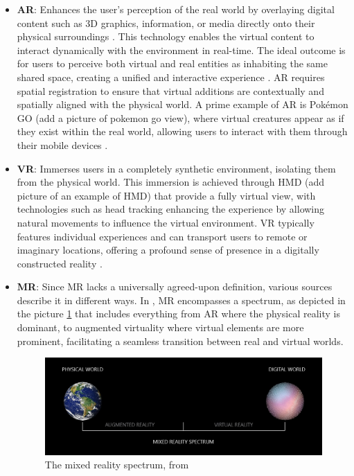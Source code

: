 \begin{itemize}
    \item \textbf{\ac{AR}}: Enhances the user's perception of the real world by overlaying digital content such as 3D graphics, information, or media directly 
    onto their physical surroundings \cite{liu2022digitaltwin}. 
    This technology enables the virtual content to interact dynamically with the environment in real-time. 
    The ideal outcome is for users to perceive both virtual and real entities as inhabiting the same shared space, creating a unified and interactive 
    experience \cite{Azuma1997}.
    \ac{AR} requires spatial registration to ensure that virtual additions are contextually and spatially aligned with the physical world.
    A prime example of \ac{AR} is Pokémon GO (add a picture of pokemon go view), where virtual creatures appear as if they exist within the real world, 
    allowing users to interact with them through their mobile devices \cite{whatismixedreality}.

    \item \textbf{\ac{VR}}: Immerses users in a completely synthetic environment, isolating them from the physical world. This immersion is achieved through 
    \ac{HMD} (add picture of an example of HMD) that provide a fully virtual view, with technologies such as head tracking enhancing the experience by 
    allowing natural movements to influence the virtual environment. \ac{VR} typically features individual experiences and can transport users to remote 
    or imaginary locations, offering a profound sense of presence in a digitally constructed reality \cite{whatismixedreality}.
    
    \item \textbf{\ac{MR}}: Since \ac{MR} lacks a universally agreed-upon definition, various sources describe it in different ways.
    In \cite{microsoft_mixed_reality}, \ac{MR} encompasses a spectrum, as depicted in the picture \ref{f:mixed-spectrum} that includes everything
    from \ac{AR} where the physical reality is dominant, to augmented virtuality where virtual elements are more prominent, facilitating a seamless
    transition between real and virtual worlds.

    \begin{figure}[h]
        \centering
        \includegraphics[width=0.85\linewidth]{figs/mixed-reality-spectrum.jpeg}
        \caption{The mixed reality spectrum, from \cite{microsoft_mixed_reality}}
        \label{f:mixed-spectrum}
    \end{figure}
    


\end{itemize}
